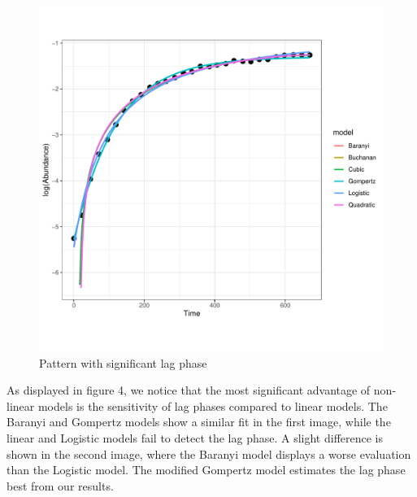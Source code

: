 \documentclass[11pt, oneside]{article}
\begin{document}
\begin{figure}[H]
\begin{center}
\begin{minipage}{.5\textwidth}
				\includegraphics[page=118, scale = 0.5]{plot_subsets.pdf}
			\end{minipage}
			\end{center}
		\caption{Pattern with significant lag phase}
		\end{figure}
		
		\noindent As displayed in figure 4, we notice that the most significant advantage of non-linear models is the sensitivity of lag phases compared to linear models. The Baranyi and Gompertz models show a similar fit in the first image, while the linear and Logistic models fail to detect the lag phase. A slight difference is shown in the second image, where the Baranyi model displays a worse evaluation than the Logistic model. The modified Gompertz model estimates the lag phase best from our results.
\end{document}
